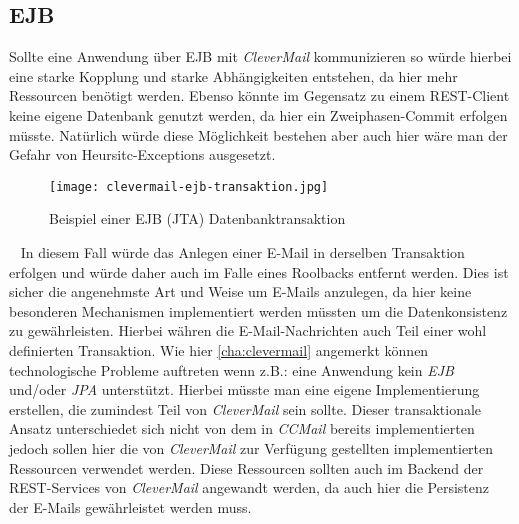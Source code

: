 \subsection{EJB}
Sollte eine Anwendung über EJB mit \emph{CleverMail} kommunizieren so würde hierbei eine starke Kopplung und starke Abhängigkeiten entstehen, da hier mehr Ressourcen benötigt werden. Ebenso könnte im Gegensatz zu einem REST-Client keine eigene Datenbank genutzt werden, da hier ein Zweiphasen-Commit erfolgen müsste. Natürlich würde diese Möglichkeit bestehen aber auch hier wäre man der Gefahr von Heursitc-Exceptions ausgesetzt.
\begin{figure}[h]
\centering
\texttt{[image: clevermail-ejb-transaktion.jpg]} %
\caption{Beispiel einer EJB (JTA) Datenbanktransaktion}
\label{fig:clevermail-rest-tcc}
\end{figure}
\ \newline
In diesem Fall würde das Anlegen einer E-Mail in derselben Transaktion erfolgen und würde daher auch im Falle eines Roolbacks entfernt werden. Dies ist sicher die angenehmste Art und Weise um E-Mails anzulegen, da hier keine besonderen Mechanismen implementiert werden müssten um die Datenkonsistenz zu gewährleisten. Hierbei währen die E-Mail-Nachrichten auch Teil einer wohl definierten Transaktion.
\newline
\newline
Wie hier \ref{cha:clevermail} angemerkt können technologische Probleme auftreten wenn z.B.: eine Anwendung kein \emph{EJB} und/oder \emph{JPA} unterstützt. Hierbei müsste man eine eigene Implementierung erstellen, die zumindest Teil von \emph{CleverMail} sein sollte.
\newline
\newline
Dieser transaktionale Ansatz unterschiedet sich nicht von dem in \emph{CCMail} bereits implementierten jedoch sollen hier die von \emph{CleverMail} zur Verfügung gestellten implementierten Ressourcen verwendet werden. Diese Ressourcen sollten auch im Backend der REST-Services von \emph{CleverMail} angewandt werden, da auch hier die Persistenz der E-Mails gewährleistet werden muss.
 
\newpage
